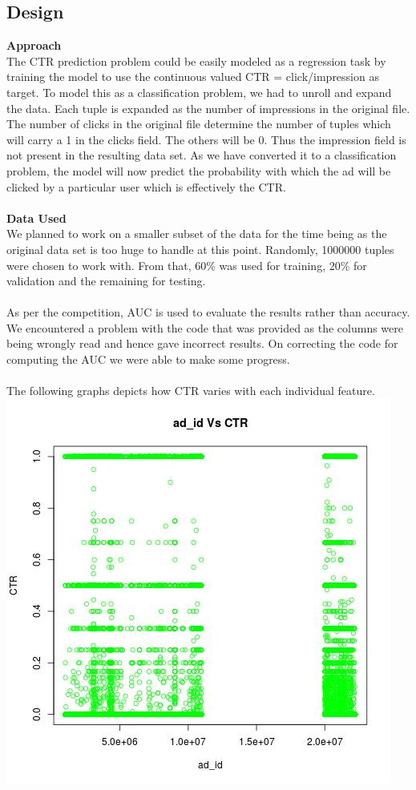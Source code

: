 \documentclass[10pt]{article}
\begin{document}
\subsection{Design}
\textbf{Approach}\\
The CTR prediction problem could be easily modeled as a regression task by training the model to use the continuous valued CTR = click/impression as target. To model this as a classification problem, we had to unroll and expand the data. Each tuple is expanded as the number of impressions in the original file. The number of clicks in the original file determine the number of tuples which will carry a 1 in the clicks field. The others will be 0. Thus the impression field is not present in the resulting data set. As we have converted it to a classification problem, the model will now predict the probability with which the ad will be clicked by a particular user which is effectively the CTR. \\\\
\textbf{Data Used}\\
We planned to work on a smaller subset of the data for the time being as the original data set is too huge to handle at this point. Randomly, 1000000 tuples were chosen to work with. From that, 60\% was used for training, 20\% for validation and the remaining for testing.\\\\
As per the competition, AUC is used to evaluate the results rather than accuracy. We encountered a problem with the code that was provided as the columns were being wrongly read and hence gave incorrect results. On correcting the code for computing the AUC we were able to make some progress. \\\\
The following graphs depicts how CTR varies with each individual feature.\\
\includegraphics[scale=0.5]{ad_id_Vs_CTR}
\end{document}
